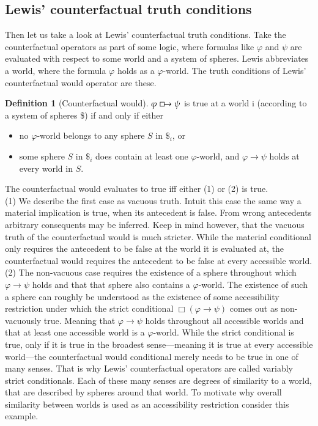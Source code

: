 \documentclass[a4paper,american,10pt]{paper}
\theoremstyle{definition}\newtheorem{definition}{Definition}
\begin{document}
\subsection{Lewis' counterfactual truth conditions}
Then let us take a look at Lewis' counterfactual truth conditions. Take the counterfactual operators as part of some logic, where formulas like $\varphi$ and $\psi$ are evaluated with respect to some world and a system of spheres. Lewis abbreviates a world, where the formula $\varphi$ holds as a $\varphi$-world. The truth conditions of Lewis' counterfactual would operator are these.
\begin{definition}[Counterfactual would]
	$\varphi\boxright\psi$ is true at a world i (according to a system of spheres \$) if and only if either
	\begin{itemize}
	\item[(1)] no $\varphi$-world belongs to any sphere $S$ in $\$_i$, or
	\item[(2)] some sphere $S$ in $\$_i$ does contain at least one $\varphi$-world, and $\varphi\rightarrow\psi$ holds at every world in $S$.
	\end{itemize}
	\label{def:counterfactual_would}
\end{definition}
\noindent The counterfactual would evaluates to true iff either (1) or (2) is true.\\
\indent (1) We describe the first case as vacuous truth. Intuit this case the same way a material implication is true, when its antecedent is false. From wrong antecedents arbitrary consequents may be inferred. Keep in mind however, that the vacuous truth of the counterfactual would is much stricter. While the material conditional only requires the antecedent to be false at the world it is evaluated at, the counterfactual would requires the antecedent to be false at every accessible world.\\
\indent (2) The non-vacuous case requires the existence of a sphere throughout which $\varphi\rightarrow\psi$ holds and that that sphere also contains a $\varphi$-world. The existence of such a sphere can roughly be understood as the existence of some accessibility restriction under which the strict conditional $\Box (\varphi\rightarrow\psi)$ comes out as non-vacuously true. Meaning that $\varphi\rightarrow\psi$ holds throughout all accessible worlds and that at least one accessible world is a $\varphi$-world. While the strict conditional is true, only if it is true in the broadest sense---meaning it is true at every accessible world---the counterfactual would conditional merely needs to be true in one of many senses. That is why Lewis' counterfactual operators are called variably strict conditionals. Each of these many senses are degrees of similarity to a world, that are described by spheres around that world. To motivate why overall similarity between worlds is used as an accessibility restriction consider this example.
\end{document}
